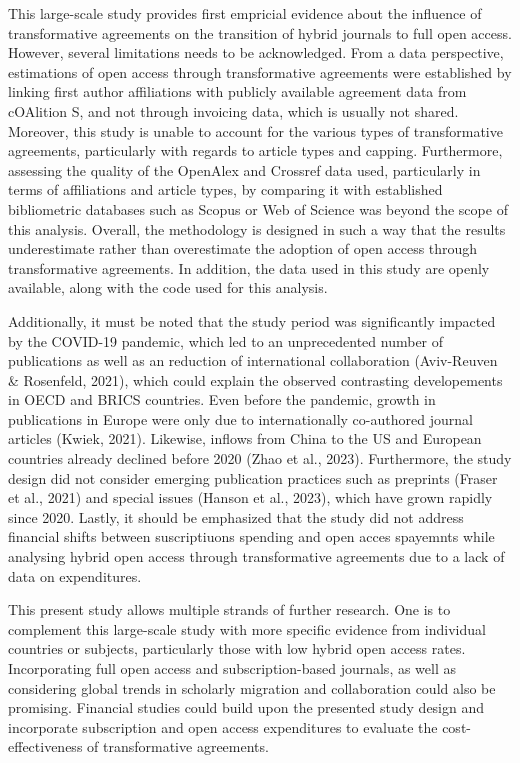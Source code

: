 \documentclass[a4paper,man,floatsintext,longtable,noextraspace,12pt]{apa6}
\begin{document}
This large-scale study provides first empricial evidence about the
influence of transformative agreements on the transition of hybrid
journals to full open access. However, several limitations needs to be
acknowledged. From a data perspective, estimations of open access
through transformative agreements were established by linking first
author affiliations with publicly available agreement data from
cOAlition S, and not through invoicing data, which is usually not
shared. Moreover, this study is unable to account for the various types
of transformative agreements, particularly with regards to article types
and capping. Furthermore, assessing the quality of the OpenAlex and
Crossref data used, particularly in terms of affiliations and article
types, by comparing it with established bibliometric databases such as
Scopus or Web of Science was beyond the scope of this analysis. Overall,
the methodology is designed in such a way that the results underestimate
rather than overestimate the adoption of open access through
transformative agreements. In addition, the data used in this study are
openly available, along with the code used for this analysis.

Additionally, it must be noted that the study period was significantly
impacted by the COVID-19 pandemic, which led to an unprecedented number
of publications as well as an reduction of international collaboration
(Aviv-Reuven \& Rosenfeld, 2021), which could explain the observed
contrasting developements in OECD and BRICS countries. Even before the
pandemic, growth in publications in Europe were only due to
internationally co-authored journal articles (Kwiek, 2021). Likewise,
inflows from China to the US and European countries already declined
before 2020 (Zhao et al., 2023). Furthermore, the study design did not
consider emerging publication practices such as preprints (Fraser et
al., 2021) and special issues (Hanson et al., 2023), which have grown
rapidly since 2020. Lastly, it should be emphasized that the study did
not address financial shifts between suscriptiuons spending and open
acces spayemnts while analysing hybrid open access through
transformative agreements due to a lack of data on expenditures.

This present study allows multiple strands of further research. One is
to complement this large-scale study with more specific evidence from
individual countries or subjects, particularly those with low hybrid
open access rates. Incorporating full open access and subscription-based
journals, as well as considering global trends in scholarly migration
and collaboration could also be promising. Financial studies could build
upon the presented study design and incorporate subscription and open
access expenditures to evaluate the cost-effectiveness of transformative
agreements.
\end{document}
